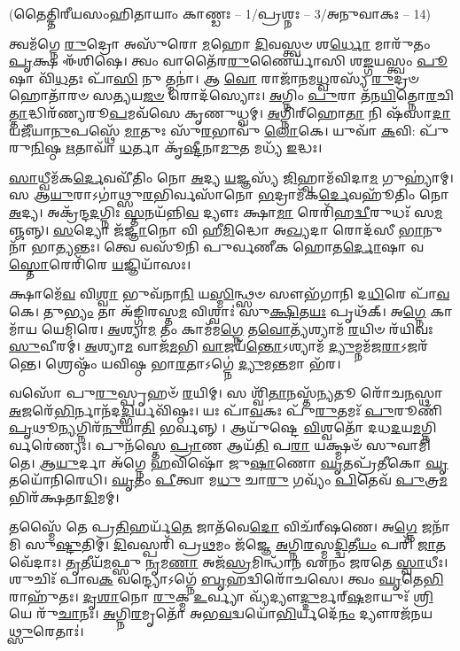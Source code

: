 {}
\centerline{\scriptsize (𑌤𑍈𑌤𑍍𑌤𑌿𑌰𑍀𑌯𑌸𑌂𑌹𑌿𑌤𑌾𑌯𑌾𑌂 𑌕𑌾𑌣𑍍𑌡𑌃 – 1/𑌪𑍍𑌰𑌶𑍍𑌨𑌃 – 3/𑌅𑌨𑍁𑌵𑌾𑌕𑌃 – 14)}

𑌤𑍍𑌵𑌮᳴𑌗𑍍𑌨𑍇 \ul{𑌰𑍁}\-𑌦𑍍𑌰𑍋 𑌅𑌸𑍁᳴𑌰𑍋 \ul{𑌮}\-𑌹𑍋 \ul{𑌦𑌿}\-𑌵𑌸𑍍𑌤𑍍𑌵𑍞 𑌶\-\ul{𑌰𑍍𑌧𑍋} 𑌮𑌾𑌰𑍁᳴𑌤𑌂 \ul{𑌪𑍃}\-𑌕𑍍𑌷 𑌈᳴𑌶𑌿𑌷𑍇। 𑌤𑍍𑌵𑌂 𑌵𑌾𑌤𑍈᳴𑌰\-\ul{𑌰𑍁}\-𑌣𑍈𑌰𑍍𑌯𑌾᳴𑌸𑌿 𑌶\-\ul{𑌙𑍍𑌗}\-𑌯𑌸𑍍𑌤𑍍𑌵𑌂 \ul{𑌪𑍂}\-𑌷𑌾 𑌵𑌿᳴\-\ul{𑌧}\-𑌤𑌃 𑌪𑌾᳴\-\ul{𑌸𑌿} 𑌨𑍁 𑌤𑍍𑌮𑌨𑌾॑।
𑌆 \ul{𑌵𑍋} 𑌰𑌾𑌜𑌾᳴𑌨𑌮\-\ul{𑌧𑍍𑌵}\-𑌰𑌸𑍍𑌯᳴ \ul{𑌰𑍁}\-𑌦𑍍𑌰𑍞 𑌹𑍋𑌤𑌾᳴𑌰𑍞 𑌸\-\ul{𑌤𑍍𑌯}\-𑌯\-\ul{𑌜}\-\-\ul{𑍞} 𑌰𑍋𑌦᳴𑌸𑍍𑌯𑍋𑌃। \ul{𑌅}\-𑌗𑍍𑌨𑌿𑌂 \ul{𑌪𑍁}\-𑌰𑌾 𑌤᳴𑌨\-\ul{𑌯𑌿}\-𑌤𑍍𑌨𑍋\-\ul{𑌰}\-𑌚𑌿\-\ul{𑌤𑍍𑌤𑌾}\-𑌦𑍍𑌧𑌿𑌰᳴𑌣𑍍𑌯𑌰𑍂\-\ul{𑌪}\-𑌮𑌵᳴𑌸𑍇 𑌕𑍃𑌣𑍁𑌧𑍍𑌵𑌮𑍍। \ul{𑌅}\-𑌗𑍍𑌨𑌿𑌰𑍍‌𑌹𑍋\-\ul{𑌤𑌾} 𑌨𑌿 𑌷᳴𑌸𑌾\-\ul{𑌦𑌾} 𑌯𑌜𑍀᳴𑌯𑌾\-\ul{𑌨𑍁}\-𑌪𑌸𑍍𑌥𑍇᳴ \ul{𑌮𑌾}\-𑌤𑍁𑌃 𑌸𑍁᳴\-\ul{𑌰}\-𑌭𑌾𑌵𑍁᳴ \ul{𑌲𑍋}\-𑌕𑍇। 𑌯𑍁𑌵𑌾᳴ \ul{𑌕}\-𑌵𑌿: 𑌪𑍁᳴𑌰𑍁\-\ul{𑌨𑌿}\-𑌷𑍍𑌠 \ul{𑌋}\-𑌤𑌾𑌵𑌾᳴ \ul{𑌧}\-𑌰𑍍𑌤𑌾 𑌕𑍃᳴\-\ul{𑌷𑍍𑌟𑍀}\-𑌨𑌾\-\ul{𑌮𑍁}\-𑌤 𑌮𑌧𑍍𑌯᳴ \ul{𑌇}\-𑌦𑍍𑌧𑌃। 

\-\ul{𑌸𑌾}\-𑌧𑍍𑌵𑍀𑌮᳴𑌕\-\ul{𑌰𑍍𑌦𑍇}\-𑌵𑌵𑍀᳴𑌤𑌿𑌂 𑌨𑍋 \ul{𑌅}\-𑌦𑍍𑌯 \ul{𑌯}\-𑌜𑍍𑌞𑌸𑍍𑌯᳴ \ul{𑌜𑌿}\-𑌹𑍍𑌵𑌾𑌮᳴𑌵𑌿𑌦𑌾\-\ul{𑌮} 𑌗𑍁𑌹𑍍𑌯𑌾॑𑌮𑍍। 𑌸 𑌆\-\ul{𑌯𑍁}\-𑌰𑌾𑌽𑌗𑌾॑𑌥𑍍𑌸𑍁\-\ul{𑌰}\-𑌭𑌿𑌰𑍍𑌵𑌸𑌾᳴𑌨𑍋 \ul{𑌭}\-𑌦𑍍𑌰𑌾𑌮᳴𑌕\-\ul{𑌰𑍍𑌦𑍇}\-𑌵𑌹𑍂᳴𑌤𑌿𑌂 𑌨𑍋 \ul{𑌅}\-𑌦𑍍𑌯। 𑌅𑌕𑍍𑌰᳴𑌨𑍍𑌦\-\ul{𑌦}\-𑌗𑍍𑌨𑌿𑌃 \ul{𑌸𑍍𑌤}\-𑌨𑌯᳴𑌨𑍍𑌨𑌿\-\ul{𑌵} 𑌦𑍍𑌯𑍗𑌃 𑌕𑍍𑌷𑌾\-\ul{𑌮𑌾} 𑌰𑍇𑌰𑌿᳴𑌹\-\ul{𑌦𑍍𑌵𑍀}\-𑌰𑍁𑌧𑌃᳴ 𑌸\-\ul{𑌮}\-𑌞𑍍𑌜𑌨𑍍𑌨𑍍। \ul{𑌸}\-𑌦𑍍𑌯𑍋 𑌜᳴\-\ul{𑌜𑍍𑌞𑌾}\-𑌨𑍋 𑌵𑌿 𑌹𑍀\-\ul{𑌮𑌿}\-𑌦𑍍𑌧𑍋 𑌅\-\ul{𑌖𑍍𑌯}\-𑌦𑌾 𑌰𑍋𑌦᳴𑌸𑍀 \ul{𑌭𑌾}\-𑌨𑍁𑌨𑌾᳴ 𑌭𑌾\-\ul{𑌤𑍍𑌯}\-𑌨𑍍𑌤𑌃। 𑌤𑍍𑌵𑍇 𑌵𑌸𑍂᳴𑌨𑌿 𑌪𑍁𑌰𑍍𑌵𑌣𑍀𑌕 𑌹𑍋𑌤\-\ul{𑌰𑍍𑌦𑍋}\-𑌷𑌾 𑌵\-\ul{𑌸𑍍𑌤𑍋}\-𑌰𑍇𑌰𑌿᳴𑌰𑍇 \ul{𑌯}\-𑌜𑍍𑌞𑌿𑌯𑌾᳴𑌸𑌃। 

𑌕𑍍𑌷𑌾𑌮𑍇᳴\-\ul{𑌵} 𑌵𑌿\-\ul{𑌶𑍍𑌵𑌾} 𑌭𑍁𑌵᳴𑌨𑌾\-\ul{𑌨𑌿} 𑌯\-\ul{𑌸𑍍𑌮𑌿}\-𑌨𑍍𑌥𑍍𑌸𑍞 𑌸𑍗𑌭᳴𑌗𑌾𑌨𑌿 𑌦\-\ul{𑌧𑌿}\-𑌰𑍇 𑌪𑌾᳴\-\ul{𑌵}\-𑌕𑍇। 𑌤𑍁\-\ul{𑌭𑍍𑌯𑌂} 𑌤𑌾 𑌅᳴𑌙𑍍𑌗𑌿𑌰𑌸𑍍𑌤\-\ul{𑌮} 𑌵𑌿𑌶𑍍𑌵𑌾𑌃॑ 𑌸𑍁\-\ul{𑌕𑍍𑌷𑌿}\-𑌤\-\ul{𑌯𑌃} 𑌪𑍃𑌥᳴𑌕𑍍। 𑌅\-\ul{𑌗𑍍𑌨𑍇} 𑌕𑌾𑌮𑌾᳴𑌯 𑌯𑍇𑌮𑌿𑌰𑍇। \ul{𑌅}\-𑌶𑍍𑌯𑌾\-\ul{𑌮} 𑌤𑌂 𑌕𑌾𑌮᳴𑌮\-\ul{𑌗𑍍𑌨𑍇} 𑌤\-\ul{𑌵𑍋}\-𑌤𑍍𑌯᳴𑌶𑍍𑌯𑌾𑌮᳴ \ul{𑌰}\-𑌯𑌿𑍞 𑌰᳴𑌯𑌿𑌵𑌃 \ul{𑌸𑍁}\-𑌵𑍀𑌰𑌮𑍍॑। \ul{𑌅}\-𑌶𑍍𑌯𑌾\-\ul{𑌮} 𑌵𑌾𑌜᳴\-\ul{𑌮}\-𑌭𑌿 \ul{𑌵𑌾}\-𑌜𑌯᳴\-\ul{𑌨𑍍𑌤𑍋}\-𑌽𑌶𑍍𑌯𑌾𑌮᳴ \ul{𑌦𑍍𑌯𑍁}\-𑌮𑍍𑌨𑌮᳴𑌜\-\ul{𑌰𑌾}\-𑌽𑌜𑌰᳴𑌨𑍍𑌤𑍇। 𑌶𑍍𑌰𑍇𑌷𑍍𑌠𑌂᳴ 𑌯𑌵𑌿𑌷𑍍𑌠 𑌭𑌾\-\ul{𑌰}\-𑌤𑌾𑌽𑌗𑍍𑌨𑍇॑ \ul{𑌦𑍍𑌯𑍁}\-𑌮\-\ul{𑌨𑍍𑌤}\-𑌮𑌾 𑌭᳴𑌰। 

𑌵𑌸𑍋᳴ 𑌪𑍁\-\ul{𑌰𑍁}\-𑌸𑍍𑌪𑍃𑌹𑍞᳴ \ul{𑌰}\-𑌯𑌿𑌮𑍍। 𑌸 𑌶𑍍𑌵𑌿᳴\-\ul{𑌤𑌾}\-𑌨𑌸𑍍𑌤᳴\-\ul{𑌨𑍍𑌯}\-𑌤𑍂 𑌰𑍋᳴𑌚\-\ul{𑌨}\-𑌸𑍍𑌥𑌾 \ul{𑌅}\-𑌜𑌰𑍇᳴\-\ul{𑌭𑌿}\-𑌰𑍍𑌨𑌾𑌨᳴𑌦\-\ul{𑌦𑍍𑌭𑌿}\-𑌰𑍍𑌯𑌵𑌿᳴𑌷𑍍𑌠𑌃। 𑌯𑌃 𑌪𑌾᳴\-\ul{𑌵}\-𑌕𑌃 𑌪𑍁᳴\-\ul{𑌰𑍁}\-𑌤𑌮𑌃᳴ \ul{𑌪𑍁}\-𑌰𑍂𑌣𑌿᳴ \ul{𑌪𑍃}\-𑌥𑍂\-\ul{𑌨𑍍𑌯}\-𑌗𑍍𑌨𑌿𑌰᳴\-\ul{𑌨𑍁}\-𑌯𑌾\-\ul{𑌤𑌿} 𑌭𑌰𑍍𑌵𑌨𑍍𑌨𑍍। 𑌆𑌯𑍁᳴𑌷𑍍𑌟𑍇 \ul{𑌵𑌿}\-𑌶𑍍𑌵𑌤𑍋᳴ 𑌦𑌧\-\ul{𑌦}\-𑌯\-\ul{𑌮}\-𑌗𑍍𑌨𑌿𑌰𑍍𑌵𑌰𑍇॑𑌣𑍍𑌯𑌃। 𑌪𑍁𑌨᳴𑌸𑍍𑌤𑍇 \ul{𑌪𑍍𑌰𑌾}\-𑌣 𑌆𑌯᳴\-\ul{𑌤𑌿} 𑌪\-\ul{𑌰𑌾} 𑌯𑌕𑍍𑌷𑍍𑌮𑍞᳴ 𑌸𑍁𑌵𑌾𑌮𑌿 𑌤𑍇। \ul{𑌆}\-\-\ul{𑌯𑍁}\-𑌰𑍍𑌦𑌾 𑌅᳴𑌗𑍍𑌨𑍇 \ul{𑌹}\-𑌵𑌿𑌷𑍋᳴ 𑌜𑍁\-\ul{𑌷𑌾}\-𑌣𑍋 \ul{𑌘𑍃}\-𑌤𑌪𑍍𑌰᳴𑌤𑍀𑌕𑍋 \ul{𑌘𑍃}\-𑌤𑌯𑍋᳴𑌨𑌿𑌰𑍇𑌧𑌿। \ul{𑌘𑍃}\-𑌤𑌂 \ul{𑌪𑍀}\-𑌤𑍍𑌵𑌾 𑌮\-\ul{𑌧𑍁} 𑌚𑌾\-\ul{𑌰𑍁} 𑌗𑌵𑍍𑌯𑌂᳴ \ul{𑌪𑌿}\-𑌤𑍇𑌵᳴ \ul{𑌪𑍁}\-𑌤𑍍𑌰\-\ul{𑌮}\-𑌭𑌿𑌰᳴𑌕𑍍𑌷𑌤𑌾\-\ul{𑌦𑌿}\-𑌮𑌮𑍍।

𑌤𑌸𑍍𑌮𑍈᳴ 𑌤𑍇 𑌪𑍍𑌰\-\ul{𑌤𑌿}\-𑌹𑌰𑍍𑌯᳴\-\ul{𑌤𑍇} 𑌜𑌾𑌤᳴𑌵𑍇\-\ul{𑌦𑍋} 𑌵𑌿𑌚᳴𑌰𑍍‌𑌷𑌣𑍇। 𑌅\-\ul{𑌗𑍍𑌨𑍇} 𑌜𑌨𑌾᳴𑌮𑌿 𑌸𑍁\-\ul{𑌷𑍍𑌟𑍁}\-𑌤𑌿𑌮𑍍। \ul{𑌦𑌿}\-𑌵𑌸𑍍𑌪𑌰𑌿᳴ 𑌪𑍍𑌰\-\ul{𑌥}\-𑌮𑌂 𑌜᳴𑌜𑍍𑌞𑍇 \ul{𑌅}\-𑌗𑍍𑌨𑌿\-\ul{𑌰}\-𑌸𑍍𑌮\-\ul{𑌦𑍍𑌦𑍍𑌵𑌿}\-𑌤𑍀\-\ul{𑌯𑌂} 𑌪𑌰𑌿᳴ \ul{𑌜𑌾}\-𑌤𑌵𑍇᳴𑌦𑌾𑌃। \ul{𑌤𑍃}\-𑌤𑍀𑌯᳴\-\ul{𑌮}\-𑌫𑍍𑌸𑍁 \ul{𑌨𑍃}\-𑌮\-\ul{𑌣𑌾} 𑌅𑌜᳴\-\ul{𑌸𑍍𑌰}\-𑌮𑌿𑌨𑍍𑌧𑌾᳴𑌨 𑌏𑌨𑌂 𑌜𑌰𑌤𑍇 \ul{𑌸𑍍𑌵𑌾}\-𑌧𑍀𑌃। 𑌶𑍁𑌚𑌿𑌃᳴ 𑌪𑌾𑌵\-\ul{𑌕} 𑌵𑌨𑍍𑌦𑍍𑌯𑍋𑌽𑌗𑍍𑌨𑍇᳴ \ul{𑌬𑍃}\-𑌹𑌦𑍍𑌵𑌿𑌰𑍋᳴𑌚𑌸𑍇। 𑌤𑍍𑌵𑌂 \ul{𑌘𑍃}\-𑌤𑍇\-\ul{𑌭𑌿}\-𑌰𑌾𑌹𑍁᳴𑌤𑌃। \ul{𑌦𑍃}\-\-\ul{𑌶𑌾}\-𑌨𑍋 \ul{𑌰𑍁}\-𑌕𑍍𑌮 \ul{𑌉}\-𑌰𑍍𑌵𑍍𑌯𑌾 𑌵𑍍𑌯᳴𑌦𑍍𑌯𑍗\-\ul{𑌦𑍍𑌦𑍁}\-𑌰𑍍𑌮𑌰𑍍‌\-\ul{𑌷}\-𑌮𑌾𑌯𑍁𑌃᳴ \ul{𑌶𑍍𑌰𑌿}\-𑌯𑍇 𑌰𑍁᳴\-\ul{𑌚𑌾}\-𑌨𑌃। \ul{𑌅}\-𑌗𑍍𑌨𑌿\-\ul{𑌰}\-𑌮𑍃𑌤𑍋᳴ 𑌅𑌭\-\ul{𑌵}\-𑌦𑍍𑌵𑌯𑍋᳴\-\ul{𑌭𑌿}\-𑌰𑍍𑌯𑌦𑍇᳴\-\ul{𑌨𑌂} 𑌦𑍍𑌯𑍗𑌰𑌜᳴𑌨𑌯\-\ul{𑌥𑍍𑌸𑍁}\-𑌰𑍇𑌤𑌾𑌃॑। 

